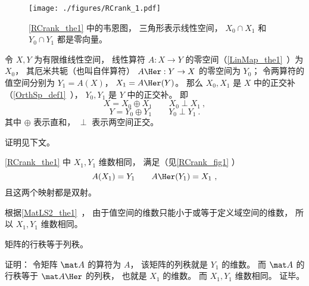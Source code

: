 

\begin{figure}[ht]
\centering
\texttt{[image: ./figures/RCrank\_1.pdf]}
\caption{\autoref{RCrank_the1} 中的韦恩图， 三角形表示线性空间， $X_0\cap X_1$ 和 $Y_0\cap  Y_1$ 都是零向量。} \label{RCrank_fig1}
\end{figure}

\begin{theorem}{}\label{RCrank_the1}
令 $X, Y$ 为有限维线性空间， 线性算符 $A:X \to Y$ 的零空间（\autoref{LinMap_the1}~）为 $X_0$， 其厄米共轭（也叫自伴算符） $A\Her: Y \to X$ 的零空间为 $Y_0$； 令两算符的值空间分别为 $Y_1 = A(X)$， $X_1 = A\Her(Y)$。 那么 $X_0, X_1$ 是 $X$ 中的正交补（\autoref{OrthSp_def1}~）， $Y_0, Y_1$ 是 $Y$ 中的正交补。 即
\begin{equation}
X = X_0 \oplus X_1 \qquad X_0 \perp X_1~,
\end{equation}
\begin{equation}
Y = Y_0 \oplus Y_1 \qquad Y_0 \perp Y_1~.
\end{equation}
其中 $\oplus$ 表示直和， $\perp$ 表示两空间正交。
\end{theorem}
证明见下文。

\begin{corollary}{}
\autoref{RCrank_the1} 中 $X_1, Y_1$ 维数相同， 满足（见\autoref{RCrank_fig1} ）
\begin{equation}\label{RCrank_eq3}
A(X_1) = Y_1 \qquad A\Her (Y_1) = X_1~,
\end{equation}
且这两个映射都是双射。
\end{corollary}
根据\autoref{MatLS2_the1}~， 
由于值空间的维数只能小于或等于定义域空间的维数， 所以 $X_1, Y_1$ 维数相同。

\begin{corollary}{}\label{RCrank_cor1}
矩阵的行秩等于列秩。
\end{corollary}
证明： 令矩阵 $\mat A$ 的算符为 $A$， 该矩阵的列秩就是 $Y_1$ 的维数。 而 $\mat A$ 的行秩等于 $\mat A\Her$ 的列秩， 也就是 $X_1$ 的维数。 而 $X_1, Y_1$ 维数相同。 证毕。

